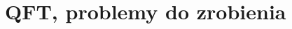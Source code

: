 \documentclass[a4paper,11pt]{article}
\begin{document}
\begin{enumerate}








\end{enumerate}










\section{QFT, problemy do zrobienia}


\end{document}
